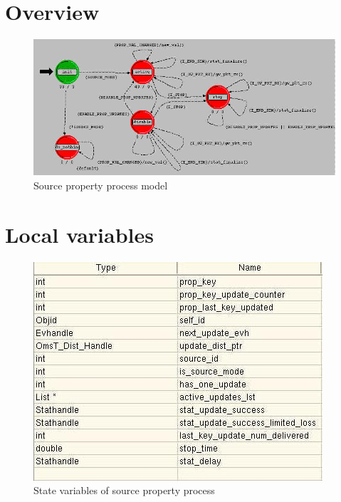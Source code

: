 
\section{Overview}
\begin{figure}[ht]
    \centering
    \includegraphics[scale=0.6]{images/p_source_property}
    \caption{Source property process model}
    \label{fig:appendix-a}
\end{figure}

\newpage

\section{Local variables}
\begin{figure}[ht]
    \centering
    \includegraphics[width=.7\textwidth]{images/state_variable_source_property}
    \caption{State variables of source property process}
    \label{fig:appendix-a_sv}
\end{figure}

